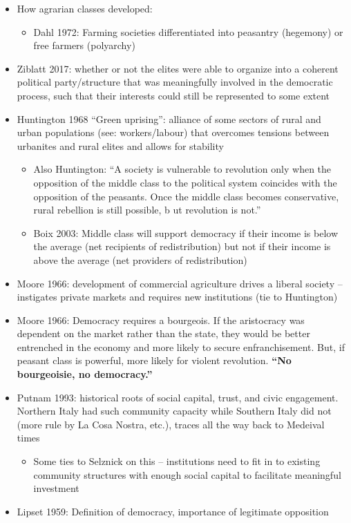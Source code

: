 \documentclass[12pt]{article}
\begin{document}
\begin{itemize}
    \item How agrarian classes developed:
    \begin{itemize}
        \item Dahl 1972: Farming societies differentiated into peasantry (hegemony) or free farmers (polyarchy)
    \end{itemize}
    \item Ziblatt 2017: whether or not the elites were able to organize into a coherent political party/structure that was meaningfully involved in the democratic process, such that their interests could still be represented to some extent
    \item Huntington 1968 ``Green uprising'': alliance of some sectors of rural and urban populations (see: workers/labour) that overcomes tensions between urbanites and rural elites and allows for stability
    \begin{itemize}
        \item Also Huntington: ``A society is vulnerable to revolution only when the opposition of the middle class to the political system coincides with the opposition of the peasants. Once the middle class becomes conservative, rural rebellion is still possible, b ut revolution is not.''
        \item Boix 2003: Middle class will support democracy if their income is below the average (net recipients of redistribution) but not if their income is above the average (net providers of redistribution)
    \end{itemize}
    \item Moore 1966: development of commercial agriculture drives a liberal society -- instigates private markets and requires new institutions (tie to Huntington)
    \item Moore 1966: Democracy requires a bourgeois. If the aristocracy was dependent on the market rather than the state, they would be better entrenched in the economy and more likely to secure enfranchisement. But, if peasant class is powerful, more likely for violent revolution. \textbf{``No bourgeoisie, no democracy.''}
    \item Putnam 1993: historical roots of social capital, trust, and civic engagement. Northern Italy had such community capacity while Southern Italy did not (more rule by La Cosa Nostra, etc.), traces all the way back to Medeival times
    \begin{itemize}
        \item Some ties to Selznick on this -- institutions need to fit in to existing community structures with enough social capital to facilitate meaningful investment
    \end{itemize}
    \item Lipset 1959: Definition of democracy, importance of legitimate opposition
\end{itemize}
\end{document}
